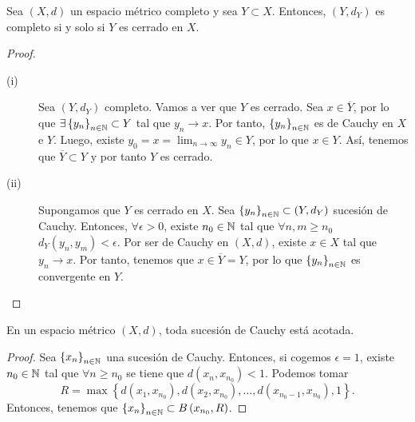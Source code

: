 \begin{prop}
Sea $\displaystyle \left(X,d\right) $ un espacio métrico completo y sea $\displaystyle Y \subset X $. Entonces, $\displaystyle \left(Y, d _{Y}\right) $ es completo si y solo si $\displaystyle Y $ es cerrado en $\displaystyle X $.
\end{prop}
\begin{proof}
\begin{description}
	\item[(i)] Sea $\displaystyle \left(Y,d _{Y}\right) $ completo. Vamos a ver que $\displaystyle Y $ es cerrado. Sea $\displaystyle x \in \overline{Y} $, por lo que $\displaystyle \exists \left\{ y_{n}\right\} _{n\in\mathbb{N}} \subset Y $ tal que $\displaystyle y_{n} \to x $.
		Por tanto, $\displaystyle \left\{ y_{n}\right\} _{n\in\mathbb{N}} $ es de Cauchy en $\displaystyle X $ e $\displaystyle Y $. Luego, existe $\displaystyle y_{0} = x = \lim_{n \to \infty}y_{n} \in Y $, por lo que $\displaystyle x \in Y $. Así, tenemos que $\displaystyle \overline{Y} \subset Y $ y por tanto $\displaystyle Y  $ es cerrado.
	\item[(ii)] Supongamos que $\displaystyle Y $ es cerrado en $\displaystyle X $. Sea $\displaystyle \left\{ y_{n}\right\} _{n\in\mathbb{N}} \subset \left(Y, d _{Y}\right) $ sucesión de Cauchy. Entonces, $\displaystyle \forall \epsilon > 0 $, existe $\displaystyle n_{0} \in \mathbb{N} $ tal que $\displaystyle \forall n,m \geq n_{0} $ $\displaystyle d _{Y}\left(y_{n}, y_{m}\right) < \epsilon  $.
		Por ser de Cauchy en $\displaystyle \left(X,d\right) $, existe $\displaystyle x \in X $ tal que $\displaystyle y_{n} \to x $. Por tanto, tenemos que $\displaystyle x \in \overline{Y} = Y $, por lo que $\displaystyle \left\{ y_{n}\right\} _{n\in\mathbb{N}} $ es convergente en $\displaystyle Y $.
\end{description}
\end{proof}
\begin{lema}
En un espacio métrico $\displaystyle \left(X,d\right) $, toda sucesión de Cauchy está acotada.
\end{lema}
\begin{proof}
	Sea $\displaystyle \left\{ x_{n}\right\} _{n\in\mathbb{N}} $ una sucesión de Cauchy. Entonces, si cogemos $\displaystyle \epsilon = 1 $, existe $\displaystyle n_{0} \in \mathbb{N} $ tal que $\displaystyle \forall n \geq n_{0} $ se tiene que $\displaystyle d\left(x_{n}, x_{n_{0}}\right) < 1 $. Podemos tomar 
	\[R = \max \left\{ d\left(x_{1}, x_{n_{0}}\right), d\left(x_{2}, x_{n_{0}}\right), \ldots, d\left(x_{n_{0}-1}, x_{n_{0}}\right), 1\right\}  .\]
	Entonces, tenemos que $\displaystyle \left\{ x_{n}\right\} _{n\in\mathbb{N}} \subset B\left(x_{n_{0}}, R\right) $.	
\end{proof}
